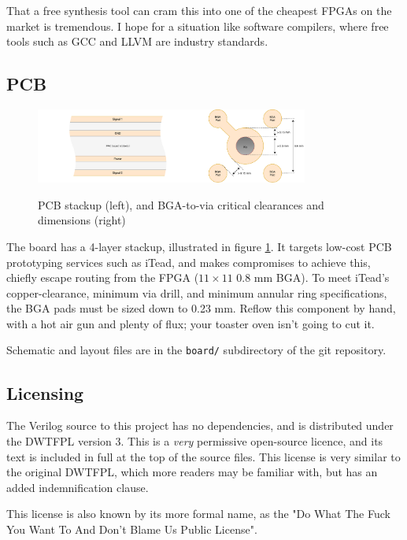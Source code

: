 \documentclass[notitlepage]{article}
\begin{document}
That a free synthesis tool can cram this into one of the cheapest FPGAs on the market is tremendous. I hope for a situation like software compilers, where free tools such as GCC and LLVM are industry standards.

\subsection{PCB}


\begin{figure}[!htb]
\centering
\caption{PCB stackup (left), and BGA-to-via critical clearances and dimensions (right)}
\includegraphics[width=0.8\textwidth]{diagrams/stackup_and_bga.pdf}
\label{diagram:stackup_and_bga}
\end{figure}

The board has a 4-layer stackup, illustrated in figure \ref{diagram:stackup_and_bga}. It targets low-cost PCB prototyping services such as iTead, and makes compromises to achieve this, chiefly escape routing from the FPGA ($11 \times 11$ 0.8 mm BGA). To meet iTead's copper-clearance, minimum via drill, and minimum annular ring specifications, the BGA pads must be sized down to 0.23 mm. Reflow this component by hand, with a hot air gun and plenty of flux; your toaster oven isn't going to cut it.

Schematic and layout files are in the {\tt board/} subdirectory of the git repository.

\subsection{Licensing}

The Verilog source to this project has no dependencies, and is distributed under the DWTFPL version 3. This is a {\it very} permissive open-source licence, and its text is included in full at the top of the source files. This license is very similar to the original DWTFPL, which more readers may be familiar with, but has an added indemnification clause.

This license is also known by its more formal name, as the "Do What The Fuck You Want To And Don't Blame Us Public License".
\end{document}
